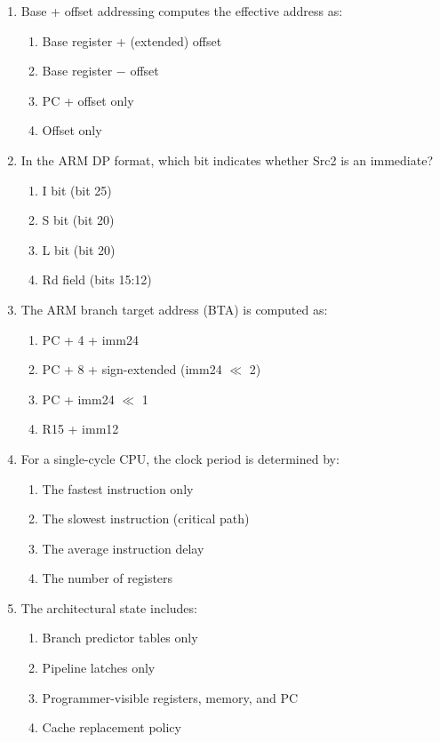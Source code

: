 \documentclass[11pt]{article}
\begin{document}
\begin{enumerate}[label=\textbf{A\arabic*.}]
  \item Base + offset addressing computes the effective address as:
  \begin{enumerate}[label=(\Alph*)]
    \item Base register + (extended) offset
    \item Base register $-$ offset
    \item PC + offset only
    \item Offset only
  \end{enumerate}

  \item In the ARM DP format, which bit indicates whether Src2 is an immediate?
  \begin{enumerate}[label=(\Alph*)]
    \item I bit (bit 25)
    \item S bit (bit 20)
    \item L bit (bit 20)
    \item Rd field (bits 15:12)
  \end{enumerate}

  \item The ARM branch target address (BTA) is computed as:
  \begin{enumerate}[label=(\Alph*)]
    \item PC + 4 + imm24
    \item PC + 8 + sign-extended (imm24 $\ll$ 2)
    \item PC + imm24 $\ll$ 1
    \item R15 + imm12
  \end{enumerate}

  \item For a single-cycle CPU, the clock period is determined by:
  \begin{enumerate}[label=(\Alph*)]
    \item The fastest instruction only
    \item The slowest instruction (critical path)
    \item The average instruction delay
    \item The number of registers
  \end{enumerate}

  \item The architectural state includes:
  \begin{enumerate}[label=(\Alph*)]
    \item Branch predictor tables only
    \item Pipeline latches only
    \item Programmer-visible registers, memory, and PC
    \item Cache replacement policy
  \end{enumerate}
\end{enumerate}
\end{document}
